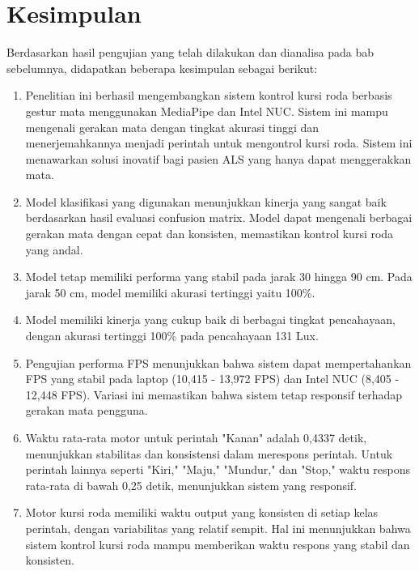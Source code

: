 \section{Kesimpulan}
\label{sec:kesimpulan}


Berdasarkan hasil pengujian yang telah dilakukan dan dianalisa pada bab sebelumnya, didapatkan beberapa kesimpulan sebagai berikut:

\begin{enumerate}

  \item Penelitian ini berhasil mengembangkan sistem kontrol kursi roda berbasis gestur mata menggunakan MediaPipe dan Intel NUC. Sistem ini mampu mengenali gerakan mata dengan tingkat akurasi tinggi dan menerjemahkannya menjadi perintah untuk mengontrol kursi roda. Sistem ini menawarkan solusi inovatif bagi pasien ALS yang hanya dapat menggerakkan mata.

  \item Model klasifikasi yang digunakan menunjukkan kinerja yang sangat baik berdasarkan hasil evaluasi confusion matrix. Model dapat mengenali berbagai gerakan mata dengan cepat dan konsisten, memastikan kontrol kursi roda yang andal.

  \item Model tetap memiliki performa yang stabil pada jarak 30 hingga 90 cm. Pada jarak 50 cm, model memiliki akurasi tertinggi yaitu 100\%.
  
  \item Model memiliki kinerja yang cukup baik di berbagai tingkat pencahayaan, dengan akurasi tertinggi 100\% pada pencahayaan 131 Lux.
  
  \item Pengujian performa FPS menunjukkan bahwa sistem dapat mempertahankan FPS yang stabil pada laptop (10,415 - 13,972 FPS) dan Intel NUC (8,405 - 12,448 FPS). Variasi ini memastikan bahwa sistem tetap responsif terhadap gerakan mata pengguna.
  
  \item Waktu rata-rata motor untuk perintah "Kanan" adalah 0,4337 detik, menunjukkan stabilitas dan konsistensi dalam merespons perintah. Untuk perintah lainnya seperti "Kiri," "Maju," "Mundur," dan "Stop," waktu respons rata-rata di bawah 0,25 detik, menunjukkan sistem yang responsif.
  
  \item Motor kursi roda memiliki waktu output yang konsisten di setiap kelas perintah, dengan variabilitas yang relatif sempit. Hal ini menunjukkan bahwa sistem kontrol kursi roda mampu memberikan waktu respons yang stabil dan konsisten.

\end{enumerate}